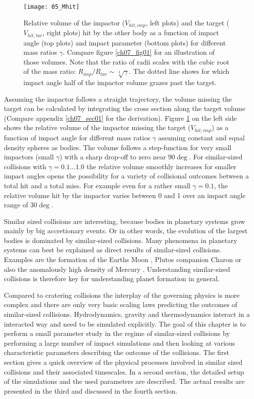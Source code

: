 \begin{figure}
\begin{center}
\texttt{[image: 05\_Mhit]}
\caption{Relative volume of the impactor ($V_{hit, imp}$, left plots) and the target ($V_{hit, tar}$, right plots) hit by the other body as a function of impact angle (top plots) and impact parameter (bottom plots) for different mass ratios $\gamma$. Compare figure \ref{ch07_fig01} for an illustration of those volumes. Note that the ratio of radii scales with the cubic root of the mass ratio: $R_{imp} / R_{tar} \sim \sqrt[3]{\gamma}$. The dotted line shows for which impact angle half of the impactor volume grazes past the target. } 
\label{ch03_fig05}
\end{center}
\end{figure}

Assuming the impactor follows a straight trajectory, the volume missing the target can be calculated by integrating the cross section along the target volume (Compare appendix \ref{ch07_sec01} for the derivation). Figure \ref{ch03_fig05} on the left side shows the relative volume of the impactor missing the target ($V_{hit, imp}$) as a function of impact angle for different mass ratios $\gamma$ assuming constant and equal density spheres as bodies. The volume follows a step-function for very small impactors (small $\gamma$) with a sharp drop-off to zero near $90 \deg$. For similar-sized collisions with $\gamma = 0.1 \dots 1.0$ the relative volume smoothly increases for smaller impact angles opens the possibility for a variety of collisional outcomes between a total hit and a total miss. For example even for a rather small $\gamma = 0.1$, the relative volume hit by the impactor varies between 0 and 1 over an impact angle range of $30 \deg$.

Similar sized collisions are interesting, because bodies in planetary systems grow mainly by big accretionary events. Or in other words, the evolution of the largest bodies is dominated by similar-sized collisions. Many phenomena in planetary systems can best be explained as direct results of similar-sized collisions. Examples are the formation of the Earths Moon \citep{Benz:1985p1755}, Plutos companion Charon \cite{Canup:2005p1987} or also the anomalously high density of Mercury \cite{Benz:1988p3336}. Understanding similar-sized collisions is therefore key for understanding planet formation in general.

Compared to cratering collisions the interplay of the governing physics is more complex and there are only very basic scaling laws predicting the outcomes of similar-sized collisions. Hydrodynamics, gravity and thermodynamics interact in a interacted way and need to be simulated explicitly. The goal of this chapter is to perform a small parameter study in the regime of similar-sized collisions by performing a large number of impact simulations and then looking at various characteristic parameters describing the outcome of the collisions. The first section gives a quick overview of the physical processes involved in similar sized collisions and their associated timescales. In a second section, the detailed setup of the simulations and the used parameters are described. The actual results are presented in the third and discussed in the fourth section.

